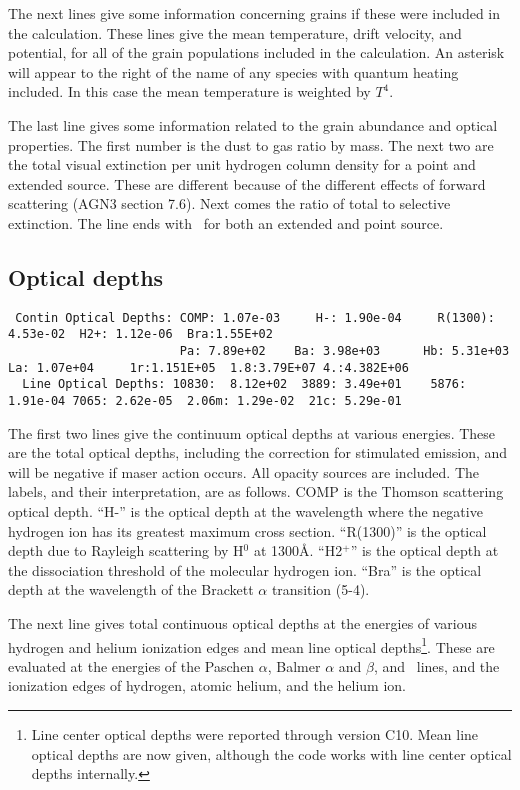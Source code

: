 The next lines give some information concerning grains if these were
included in the calculation.
These lines give the mean temperature, drift
velocity, and potential, for all of the grain populations included in the
calculation.
An asterisk will appear to the right of the name of any
species with quantum heating included.
In this case the mean temperature
is weighted by $T^4$.

The last line gives some information related to the grain abundance and
optical properties.
The first number is the dust to gas ratio by mass.
The next two are the total visual extinction per unit hydrogen column density
for a point and extended source.
These are different because of the
different effects of forward scattering (AGN3 section 7.6).
Next comes
the ratio of total to selective extinction.
The line ends with \Av\ for both
an extended and point source.

\subsection{Optical depths}
{\setverbatimfontsize{\tiny}
\begin{verbatim}
 Contin Optical Depths: COMP: 1.07e-03     H-: 1.90e-04     R(1300): 4.53e-02  H2+: 1.12e-06  Bra:1.55E+02
                        Pa: 7.89e+02    Ba: 3.98e+03      Hb: 5.31e+03    La: 1.07e+04     1r:1.151E+05  1.8:3.79E+07 4.:4.382E+06
  Line Optical Depths: 10830:  8.12e+02  3889: 3.49e+01    5876: 1.91e-04 7065: 2.62e-05  2.06m: 1.29e-02  21c: 5.29e-01
\end{verbatim}
}

The first two lines give the continuum optical depths at various energies.
These are the total optical depths, including the correction for stimulated
emission, and will be negative if maser action occurs. All opacity sources
are included.
The labels, and their interpretation, are as follows. COMP
is the Thomson scattering optical depth.
``H-'' is the optical depth at the
wavelength where the negative hydrogen ion has its greatest maximum cross
section.
``R(1300)'' is the optical depth due to Rayleigh scattering by
H$^0$ at 1300\AA .
``H2$^+$'' is the optical depth at the dissociation threshold
of the molecular hydrogen ion.
``Bra'' is the optical depth at the
wavelength of the Brackett $\alpha$ transition (5-4).

The next line gives total continuous optical depths at the energies of
various hydrogen and helium ionization edges and 
mean line optical depths\footnote{Line center optical depths were reported through version C10.
Mean line optical depths are now given, although the code works
with line center optical depths internally.}. These are evaluated
at the energies of the Paschen $\alpha$, Balmer $\alpha$ and $\beta$, and
\la\ lines, and the
ionization edges of hydrogen, atomic helium, and the helium ion.


